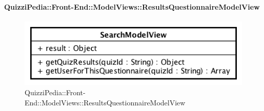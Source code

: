 \paragraph{QuizziPedia::Front-End::ModelViews::ResultsQuestionnaireModelView}
	
	\label{QuizziPedia::Front-End::ModelViews::ResultsQuestionnaireModelView}
	
	\begin{figure}[ht]
		\centering
		\includegraphics[scale=0.8,keepaspectratio]{UML/Classi/Front-End/QuizziPedia_Front-end_ModelView_ResultsQuestionnaireModelView.png}
		\caption{QuizziPedia::Front-End::ModelViews::ResultsQuestionnaireModelView}
	\end{figure} \FloatBarrier
	
